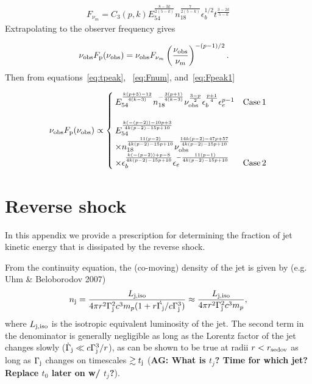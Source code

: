 \documentclass[usenatbib,fleqn]{mnras}
\begin{document}
\begin{align}
  F_{\nu_m} =  C_3(p, k) E_{54}^{\frac{8-3 k}{2 (5-k)}}
  n_{18}^{\frac{7}{2 (5-k)}} \epsilon_b^{1/2} t^{\frac{3-2 k}{5-k}}
\label{eq:Fnum}
\end{align}
%
Extrapolating to the observer frequency gives 

\begin{align}
  \nu_{\rm obs} F_{\rm p} (\nu_{\rm obs}) &= \nu_{\rm obs}   F_{\nu_m}
  \left(\frac{\nu_{\rm obs}}{\nu_m}\right)^{-(p-1)/2}.
  \label{eq:Fpeak1}
\end{align}
%
Then from equations~\eqref{eq:tpeak}, ~\eqref{eq:Fnum},
and~\eqref{eq:Fpeak1}

\begin{align}
  \nu_{\rm obs} F_{\rm p} (\nu_{\rm obs}) \propto
  \begin{cases}
    E_{54}^{\frac{k (p+5)-12}{4 (k-3)}} n_{18}^{-\frac{3 (p+1)}{4
        (k-3)}} \nu_{\rm obs}^{\frac{3-p}{2}}
    \epsilon_b^{\frac{p+1}{4}} \epsilon_e^{p-1} & {\rm Case \,
      1}\\\\
    E_{54}^{\frac{k(-(p-2))-10 p+3}{4 k (p-2)-15 p+10}} \\ \times
    n_{18}^{\frac{11 (p-2)}{4 k (p-2)-15 p+10}} \nu_{\rm
      obs}^{\frac{14 k (p-2)-47 p+57}{4 k (p-2)-15 p+10}} \\ \times
    \epsilon_b^{\frac{k (-(p-2))+p-8}{4 k(p-2)-15 p+10}}
    \epsilon_e^{-\frac{11 (p-1)}{4 k (p-2)-15p+10}} & {\rm Case \, 2}
  \end{cases}
  \label{eq:peakLumGen}
\end{align}


\section{Reverse shock}
\label{sec:reverse}
In this appendix we provide a prescription for determining the
fraction of jet kinetic energy that is dissipated by the reverse
shock.

From the continuity equation, the (co-moving) density of the jet is
given by (e.g. Uhm \& Beloborodov 2007)
 \begin{align}
   n_{\rm j} =  \frac{L_{\rm j, iso}}{4 \pi r^{2}\Gamma_{\rm
       j}^{2}c^{3}m_p(1 + r \dot{\Gamma_{\rm j}}/c\Gamma_{\rm j}^{3})}
   \approx  \frac{L_{\rm j, iso}}{4 \pi r^{2}\Gamma_{\rm j}^{2}c^{3}m_p},
\end{align}
%
where $L_{\rm j, iso}$ is the isotropic equivalent luminosity of the
jet. The second term in the denominator is generally negligible as
long as the Lorentz factor of the jet changes slowly
($\dot{\Gamma}_{\rm j} \ll c\Gamma_{\rm j}^{3}/r$), as can be shown to
be true at radii $r < r_{\rm sedov}$ as long as $\Gamma_{\rm j}$
changes on timescales $\gtrsim t_{\rm j}$ ({\bf AG: What is $t_j$?
  Time for which jet? Replace $t_0$ later on w/ $t_j$?}).
\end{document}
